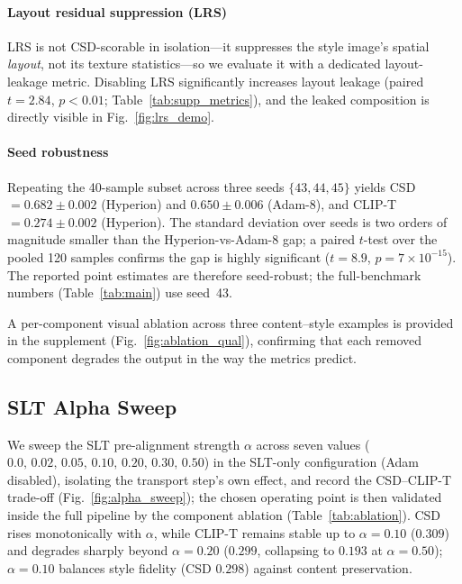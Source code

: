 \paragraph{Layout residual suppression (LRS)}
LRS is not CSD-scorable in isolation---it suppresses the style image's spatial
\emph{layout}, not its texture statistics---so we evaluate it with a dedicated
layout-leakage metric. Disabling LRS significantly increases layout leakage
(paired $t{=}2.84$, $p<0.01$; Table~\ref{tab:supp_metrics}), and the leaked
composition is directly visible in Fig.~\ref{fig:lrs_demo}.

\paragraph{Seed robustness}
Repeating the 40-sample subset across three seeds $\{43, 44, 45\}$ yields
CSD~$= 0.682 \pm 0.002$ (Hyperion) and $0.650 \pm 0.006$ (Adam-8), and
CLIP-T~$= 0.274 \pm 0.002$ (Hyperion).
The standard deviation over seeds is two orders of magnitude smaller than the
Hyperion-vs-Adam-8 gap; a paired $t$-test over the pooled 120 samples confirms
the gap is highly significant ($t = 8.9$, $p = 7\times10^{-15}$).
The reported point estimates are therefore seed-robust; the full-benchmark
numbers (Table~\ref{tab:main}) use seed~43.

A per-component visual ablation across three content--style examples is provided
in the supplement (Fig.~\ref{fig:ablation_qual}), confirming that each removed
component degrades the output in the way the metrics predict.

\subsection{SLT Alpha Sweep}
\label{sec:ablation:alpha}

We sweep the SLT pre-alignment strength $\alpha$
across seven values ($0.0,\,0.02,\,0.05,\,0.10,\,0.20,\,0.30,\,0.50$)
in the SLT-only configuration (Adam disabled), isolating the transport
step's own effect, and record the CSD--CLIP-T trade-off
(Fig.~\ref{fig:alpha_sweep}); the chosen operating point is then validated
inside the full pipeline by the component ablation
(Table~\ref{tab:ablation}).
CSD rises monotonically with $\alpha$, while CLIP-T remains stable up to
$\alpha=0.10$ ($0.309$) and degrades sharply beyond $\alpha=0.20$ ($0.299$,
collapsing to $0.193$ at $\alpha=0.50$); $\alpha=0.10$ balances style
fidelity (CSD $0.298$) against content preservation.

